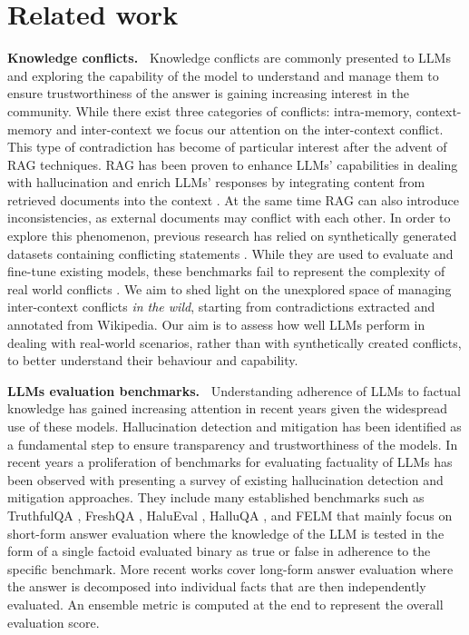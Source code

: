 \section{Related work}
\label{sec:rel}
\textbf{Knowledge conflicts.~}
Knowledge conflicts are commonly presented to LLMs and exploring the capability of the model to understand and manage them to ensure trustworthiness of the answer is gaining increasing interest in the community. While there exist three categories of conflicts: intra-memory, context-memory and inter-context \citep{xu2024knowledge} we focus our attention on the inter-context conflict. This type of contradiction has become of particular interest after the advent of RAG techniques. RAG has been proven to enhance LLMs' capabilities in dealing with hallucination and enrich LLMs' responses by integrating content from retrieved documents into the context \citep{lewis2021retrievalaugmented}. At the same time RAG can also introduce inconsistencies, as external documents may conflict with each other.
In order to explore this phenomenon, previous research has relied on synthetically generated datasets containing conflicting statements \citep{wang2023resolving, li2024contradoc}. While they are used to evaluate and fine-tune existing models, these benchmarks fail to represent the complexity of real world conflicts \citep{xu2024knowledge}. We aim to shed light on the unexplored space of managing inter-context conflicts \textit{in the wild}, starting from contradictions extracted and annotated from Wikipedia. Our aim is to assess how well LLMs perform in dealing with real-world scenarios, rather than with synthetically created conflicts, to better understand their behaviour and capability. 

\textbf{LLMs evaluation benchmarks.~}
Understanding adherence of LLMs to factual knowledge has gained increasing attention in recent years given the widespread use of these models. Hallucination detection and mitigation has been identified as a fundamental step to ensure transparency and trustworthiness of the models. In recent years a proliferation of benchmarks for evaluating factuality of LLMs has been observed with \citep{huang2023survey} presenting a survey of existing hallucination detection and mitigation approaches. They include many established benchmarks such as TruthfulQA \citep{lin2022truthfulqa}, FreshQA \citep{vu2023freshllms}, HaluEval \citep{li2023halueval}, HalluQA \citep{cheng2023evaluating}, and FELM \citep{chen2023felm} that mainly focus on short-form answer evaluation where the knowledge of the LLM is tested in the form of a single factoid evaluated binary as true or false in adherence to the specific benchmark. More recent works \citep{wei2024longform,min-etal-2023-factscore} cover long-form answer evaluation where the answer is decomposed into individual facts that are then independently evaluated. An ensemble metric is computed at the end to represent the overall evaluation score.

